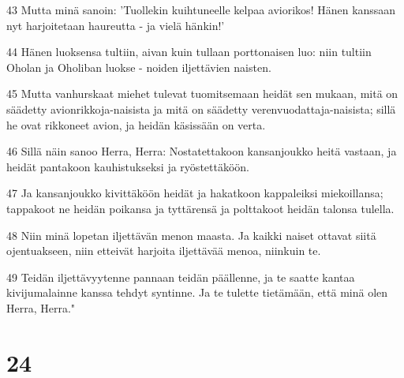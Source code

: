 \par 43 Mutta minä sanoin: 'Tuollekin kuihtuneelle kelpaa aviorikos! Hänen kanssaan nyt harjoitetaan haureutta - ja vielä hänkin!'
\par 44 Hänen luoksensa tultiin, aivan kuin tullaan porttonaisen luo: niin tultiin Oholan ja Oholiban luokse - noiden iljettävien naisten.
\par 45 Mutta vanhurskaat miehet tulevat tuomitsemaan heidät sen mukaan, mitä on säädetty avionrikkoja-naisista ja mitä on säädetty verenvuodattaja-naisista; sillä he ovat rikkoneet avion, ja heidän käsissään on verta.
\par 46 Sillä näin sanoo Herra, Herra: Nostatettakoon kansanjoukko heitä vastaan, ja heidät pantakoon kauhistukseksi ja ryöstettäköön.
\par 47 Ja kansanjoukko kivittäköön heidät ja hakatkoon kappaleiksi miekoillansa; tappakoot ne heidän poikansa ja tyttärensä ja polttakoot heidän talonsa tulella.
\par 48 Niin minä lopetan iljettävän menon maasta. Ja kaikki naiset ottavat siitä ojentuakseen, niin etteivät harjoita iljettävää menoa, niinkuin te.
\par 49 Teidän iljettävyytenne pannaan teidän päällenne, ja te saatte kantaa kivijumalainne kanssa tehdyt syntinne. Ja te tulette tietämään, että minä olen Herra, Herra."

\chapter{24}

